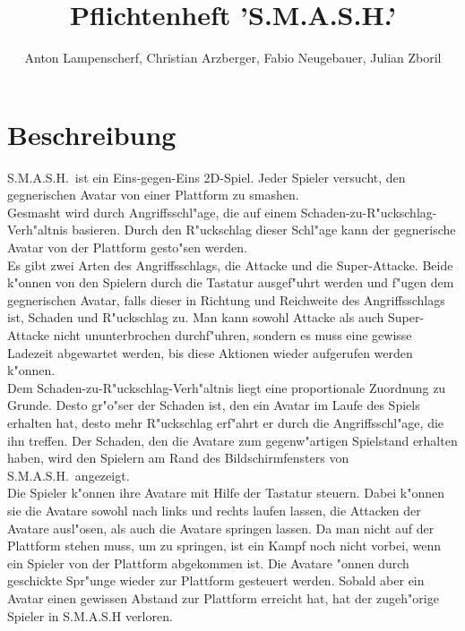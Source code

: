 \documentclass[a4paper, 11pt]{article}
\title{Pflichtenheft 'S.M.A.S.H.'}
\author{Anton Lampenscherf, Christian Arzberger, Fabio Neugebauer, Julian Zboril}
\begin{document}
    \maketitle

    \section{Beschreibung}\label{sec:beschreibung}
    S.M.A.S.H.\ ist ein Eins-gegen-Eins 2D-Spiel.
    Jeder Spieler versucht, den gegnerischen Avatar von einer Plattform zu \glqq smashen\grqq.\\

    \noindent
    Gesmasht wird durch Angriffsschl"age, die auf einem Schaden-zu-R"uckschlag-Verh"altnis basieren.
    Durch den R"uckschlag dieser Schl"age kann der gegnerische Avatar von der Plattform gesto"sen werden.\\

    \noindent
    Es gibt zwei Arten des Angriffsschlags, die Attacke und die Super-Attacke.
    Beide k"onnen von den Spielern durch die Tastatur ausgef"uhrt werden und f"ugen dem gegnerischen Avatar, falls dieser in Richtung und Reichweite des Angriffsschlags ist, Schaden und R"uckschlag zu. Man kann sowohl Attacke als auch Super-Attacke nicht ununterbrochen durchf"uhren, sondern es muss eine gewisse Ladezeit abgewartet werden, bis diese Aktionen wieder aufgerufen werden k"onnen.\\

    \noindent
    Dem Schaden-zu-R"uckschlag-Verh"altnis liegt eine proportionale Zuordnung zu Grunde.
    Desto gr"o"ser der Schaden ist, den ein Avatar im Laufe des Spiels erhalten hat, desto mehr R"uckschlag erf"ahrt er durch die Angriffsschl"age, die ihn treffen.
    Der Schaden, den die Avatare zum gegenw"artigen Spielstand erhalten haben, wird den Spielern am Rand des Bildschirmfensters von S.M.A.S.H.\ angezeigt.\\

    \noindent
    Die Spieler k"onnen ihre Avatare mit Hilfe der Tastatur steuern.
    Dabei k"onnen sie die Avatare sowohl nach links und rechts laufen lassen, die Attacken der Avatare ausl"osen, als auch die Avatare springen lassen.
    Da man nicht auf der Plattform stehen muss, um zu springen, ist ein Kampf noch nicht vorbei, wenn ein Spieler von der Plattform abgekommen ist.
    Die Avatare "onnen durch geschickte Spr"unge wieder zur Plattform gesteuert werden.
    Sobald aber ein Avatar einen gewissen Abstand zur Plattform erreicht hat, hat der zugeh"orige Spieler in S.M.A.S.H verloren.\\
\end{document}
